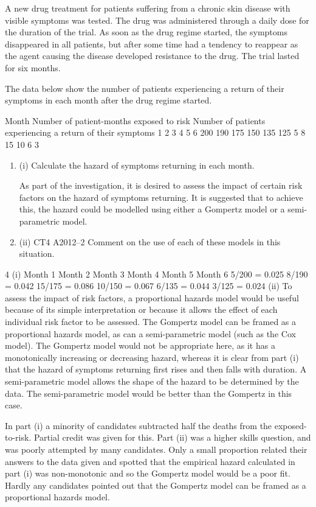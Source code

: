 \documentclass[a4paper,12pt]{article}
\begin{document}
\large
\noindent A new drug treatment for patients suffering from a chronic skin disease with visible symptoms was tested. The drug was administered through a daily dose for the duration of the trial. As soon as the drug regime started, the symptoms disappeared in all patients, but after some time had a tendency to reappear as the agent causing the disease developed resistance to the drug. The trial lasted for six months.

The data below show the number of patients experiencing a return of their symptoms
in each month after the drug regime started.

Month Number of patient-months
exposed to risk Number of patients experiencing
a return of their symptoms
1
2
3
4
5
6 200
190
175
150
135
125 5
8
15
10
6
3

\begin{enumerate}
\item (i)
Calculate the hazard of symptoms returning in each month.

As part of the investigation, it is desired to assess the impact of certain risk factors on the hazard of symptoms returning. It is suggested that to achieve this, the hazard could be modelled using either a Gompertz model or a semi-parametric model.
\item (ii)
CT4 A2012–2
Comment on the use of each of these models in this situation.
\end{enumerate}
\newpage

\newpage

4
(i) Month 1
Month 2
Month 3
Month 4
Month 5
Month 6
5/200 = 0.025
8/190 = 0.042
15/175 = 0.086
10/150 = 0.067
6/135 = 0.044
3/125 = 0.024
(ii) To assess the impact of risk factors, a proportional hazards model would be useful because of its simple interpretation or because it allows the effect of each individual risk factor to be assessed.
The Gompertz model can be framed as a proportional hazards model, as can a semi-parametric model (such as the Cox model).
The Gompertz model would not be appropriate here, as it has a monotonically increasing or decreasing hazard,
whereas it is clear from part (i) that the hazard of symptoms returning first rises and then falls with duration.
\medskip
A semi-parametric model allows the shape of the hazard to be determined by the data.
The semi-parametric model would be better than the Gompertz in this case.

\newpage
In part (i) a minority of candidates subtracted half the deaths from the exposed-to-risk. Partial credit was given for this. Part (ii) 
was a higher skills question, and was poorly
attempted by many candidates. Only a small proportion related their answers to the data 
given and spotted that the empirical hazard calculated in part (i) was non-monotonic and so
the Gompertz model would be a poor fit. Hardly any candidates pointed out that the
Gompertz model can be framed as a proportional hazards model.
\end{document}
